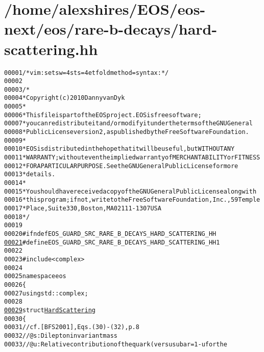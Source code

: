 \hypertarget{hard-scattering_8hh_source}{
\section{/home/alexshires/EOS/eos-\/next/eos/rare-\/b-\/decays/hard-\/scattering.hh}
}


\begin{footnotesize}\begin{alltt}
00001 \textcolor{comment}{/* vim: set sw=4 sts=4 et foldmethod=syntax : */}
00002 
00003 \textcolor{comment}{/*}
00004 \textcolor{comment}{ * Copyright (c) 2010 Danny van Dyk}
00005 \textcolor{comment}{ *}
00006 \textcolor{comment}{ * This file is part of the EOS project. EOS is free software;}
00007 \textcolor{comment}{ * you can redistribute it and/or modify it under the terms of the GNU General}
00008 \textcolor{comment}{ * Public License version 2, as published by the Free Software Foundation.}
00009 \textcolor{comment}{ *}
00010 \textcolor{comment}{ * EOS is distributed in the hope that it will be useful, but WITHOUT ANY}
00011 \textcolor{comment}{ * WARRANTY; without even the implied warranty of MERCHANTABILITY or FITNESS}
00012 \textcolor{comment}{ * FOR A PARTICULAR PURPOSE.  See the GNU General Public License for more}
00013 \textcolor{comment}{ * details.}
00014 \textcolor{comment}{ *}
00015 \textcolor{comment}{ * You should have received a copy of the GNU General Public License along with}
00016 \textcolor{comment}{ * this program; if not, write to the Free Software Foundation, Inc., 59 Temple}
00017 \textcolor{comment}{ * Place, Suite 330, Boston, MA  02111-1307  USA}
00018 \textcolor{comment}{ */}
00019 
00020 \textcolor{preprocessor}{#ifndef EOS\_GUARD\_SRC\_RARE\_B\_DECAYS\_HARD\_SCATTERING\_HH}
\hypertarget{hard-scattering_8hh_source_l00021}{}\hyperlink{hard-scattering_8hh_af586398d56cad6df3a9918a7a249495b}{00021} \textcolor{preprocessor}{}\textcolor{preprocessor}{#define EOS\_GUARD\_SRC\_RARE\_B\_DECAYS\_HARD\_SCATTERING\_HH 1}
00022 \textcolor{preprocessor}{}
00023 \textcolor{preprocessor}{#include <complex>}
00024 
00025 \textcolor{keyword}{namespace }eos
00026 \{
00027     \textcolor{keyword}{using} std::complex;
00028 
\hypertarget{hard-scattering_8hh_source_l00029}{}\hyperlink{structeos_1_1HardScattering}{00029}     \textcolor{keyword}{struct }\hyperlink{structeos_1_1HardScattering}{HardScattering}
00030     \{
00031         \textcolor{comment}{// cf. [BFS2001], Eqs. (30)-(32), p. 8}
00032         \textcolor{comment}{// @s    : Dilepton invariant mass}
00033         \textcolor{comment}{// @u    : Relative contribution of the quark (versus ubar = 1-u for the}

\end{alltt}
\end{footnotesize}
